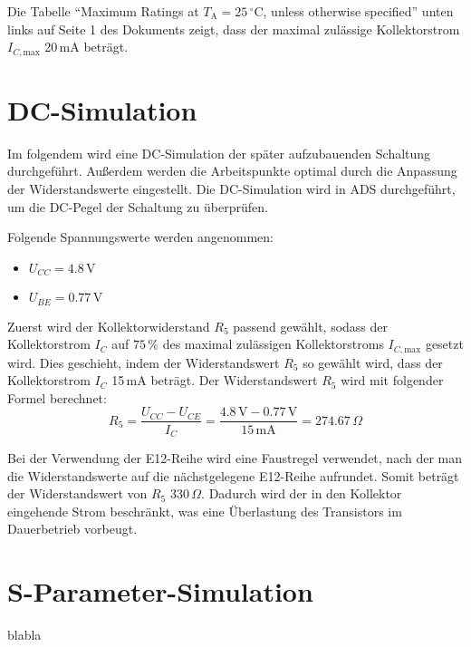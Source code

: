 Die Tabelle \enquote{Maximum Ratings at $T_\mathrm{A}=25\,^\circ\mathrm{C}$, unless otherwise specified} unten links auf Seite 1 des Dokuments zeigt, dass der maximal zulässige Kollektorstrom $I_{C,\mathrm{max}}$ 20\,mA beträgt.
\section{DC-Simulation}
Im folgendem wird eine DC-Simulation der später aufzubauenden Schaltung durchgeführt. 
Außerdem werden die Arbeitspunkte optimal durch die Anpassung der Widerstandswerte eingestellt.
Die DC-Simulation wird in \ac{ADS} durchgeführt, um die DC-Pegel der Schaltung zu überprüfen.

Folgende Spannungswerte werden angenommen:
\begin{itemize}
    \item $U_{CC} = 4.8\,\mathrm{V}$
    \item $U_{BE} = 0.77\,\mathrm{V}$
\end{itemize}

Zuerst wird der Kollektorwiderstand $R_5$ passend gewählt, sodass der Kollektorstrom $I_C$ auf $75\,\%$ des maximal zulässigen Kollektorstroms $I_{C,\mathrm{max}}$ gesetzt wird. 
Dies geschieht, indem der Widerstandswert $R_5$ so gewählt wird, dass der Kollektorstrom $I_C$ 15\,mA beträgt.
Der Widerstandswert $R_5$ wird mit folgender Formel berechnet:
\begin{equation}
    R_5 = \frac{U_{CC} - U_{CE}}{I_C} = \frac{4.8\,\mathrm{V} - 0.77\,\mathrm{V}}{15\,\mathrm{mA}} = 274.67\,\Omega
\end{equation}

Bei der Verwendung der E12-Reihe wird eine Faustregel verwendet, nach der man die Widerstandswerte auf die nächstgelegene E12-Reihe aufrundet. 
Somit beträgt der Widerstandswert von $R_5$ 330\,\(\Omega\). Dadurch wird der in den Kollektor eingehende Strom beschränkt, was eine Überlastung des Transistors im Dauerbetrieb vorbeugt.
\section{S-Parameter-Simulation}

blabla
\clearpage
